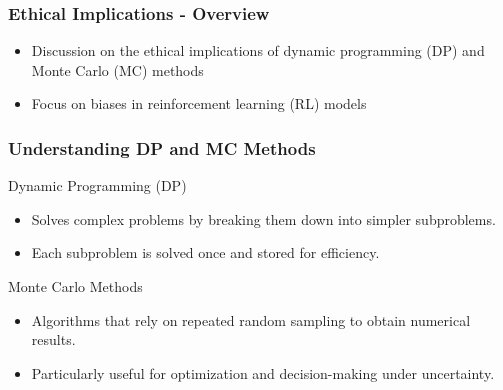 \documentclass[aspectratio=169]{beamer}
\begin{document}
\begin{frame}[fragile]
    \frametitle{Ethical Implications - Overview}
    \begin{itemize}
        \item Discussion on the ethical implications of dynamic programming (DP) and Monte Carlo (MC) methods
        \item Focus on biases in reinforcement learning (RL) models
    \end{itemize}
\end{frame}

\begin{frame}[fragile]
    \frametitle{Understanding DP and MC Methods}
    \begin{block}{Dynamic Programming (DP)}
        \begin{itemize}
            \item Solves complex problems by breaking them down into simpler subproblems.
            \item Each subproblem is solved once and stored for efficiency.
        \end{itemize}
    \end{block}

    \begin{block}{Monte Carlo Methods}
        \begin{itemize}
            \item Algorithms that rely on repeated random sampling to obtain numerical results.
            \item Particularly useful for optimization and decision-making under uncertainty.
        \end{itemize}
    \end{block}
\end{frame}
\end{document}

